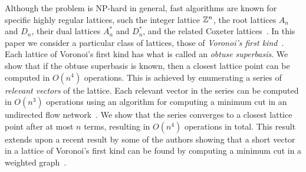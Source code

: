\documentclass[final,leqno]{siamltex}
\begin{document}
Although the problem is NP-hard in general, fast algorithms are known for specific highly regular lattices, such the integer lattice ${\mathbb Z}^{n}$, the root lattices $A_n$ and $D_n$, their dual lattices $A_n^*$ and $D_n^*$, and the related Coxeter lattices~\cite[Chap.~4]{SPLAG}\cite{Conway1982FastQuantDec, McKilliam2008, McKilliam2009CoxeterLattices}.  In this paper we consider a particular class of lattices, those of \emph{Voronoi's first kind}~\cite{ConwaySloane1992_voronoi_lattice_3d_obtuse_superbases,Valentin2003_coverings_tilings_low_dimension,Voronoi1908_main_paper}.  Each lattice of Voronoi's first kind has what is called an \emph{obtuse superbasis}.  We show that if the obtuse superbasis is known, then a closest lattice point can be computed in $O(n^4)$ operations.  This is achieved by enumerating a series of \emph{relevant vectors} of the lattice.  Each relevant vector in the series can be computed in $O(n^3)$ operations using an algorithm for computing a minimum cut in an undirected flow network~\cite{Picard_min_cuts_1974,Sankaran_solving_CDMA_mincut_1998,Ulukus_cdma_mincut_1998,Cormen2001}.  We show that the series converges to a closest lattice point after at most $n$ terms, resulting in $O(n^4)$ operations in total.  This result extends upon a recent result by some of the authors showing that a short vector in a lattice of Voronoi's first kind can be found by computing a minimum cut in a weighted graph~\cite{McKilliam_short_vectors_first_type_isit_2012}.

\end{document}

